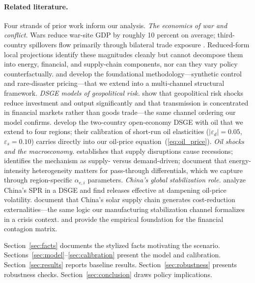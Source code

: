 \documentclass[12pt]{article}
\begin{document}
\paragraph{Related literature.} Four strands of prior work inform our analysis. \textit{The economics of war and conflict.} Wars reduce war-site GDP by roughly 10 percent on average; third-country spillovers flow primarily through bilateral trade exposure \citep{federle2026price}. Reduced-form local projections identify these magnitudes cleanly but cannot decompose them into energy, financial, and supply-chain components, nor can they vary policy counterfactually. \citet{abadie2003economic} and \citet{barro2006rare} develop the foundational methodology---synthetic control and rare-disaster pricing---that we extend into a multi-channel structural framework. \textit{DSGE models of geopolitical risk.} \citet{caldara2022measuring} show that geopolitical risk shocks reduce investment and output significantly and that transmission is concentrated in financial markets rather than goods trade---the same channel ordering our model confirms. \citet{bodenstein2011oil} develop the two-country open-economy DSGE with oil that we extend to four regions; their calibration of short-run oil elasticities ($|\varepsilon_d| = 0.05$, $\varepsilon_s = 0.10$) carries directly into our oil-price equation~(\ref{eq:oil_price}). \textit{Oil shocks and the macroeconomy.} \citet{hamilton1983oil} establishes that supply disruptions cause recessions; \citet{kilian2009not} identifies the mechanism as supply- versus demand-driven; \citet{blanchard2007macroeconomic} document that energy-intensity heterogeneity matters for pass-through differentials, which we capture through region-specific $\alpha_{e,i}$ parameters. \textit{China's global stabilization role.} \citet{zhang2020china} analyze China's SPR in a DSGE and find releases effective at dampening oil-price volatility. \citet{helveston2019china} document that China's solar supply chain generates cost-reduction externalities---the same logic our manufacturing stabilization channel formalizes in a crisis context. \citet{longstaff2011financial} and \citet{rey2015dilemma} provide the empirical foundation for the financial contagion matrix.

Section~\ref{sec:facts} documents the stylized facts motivating the scenario. Sections~\ref{sec:model}--\ref{sec:calibration} present the model and calibration. Section~\ref{sec:results} reports baseline results. Section~\ref{sec:robustness} presents robustness checks. Section~\ref{sec:conclusion} draws policy implications.
\end{document}
